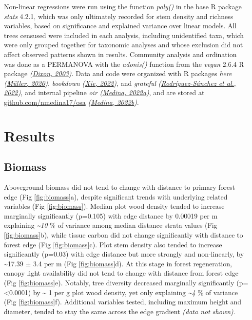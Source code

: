 \documentclass[
  12pt,
]{article}
\begin{document}
Non-linear regressions were run using the function \emph{poly()} in the base R package \emph{stats} 4.2.1,
which was only ultimately recorded for stem density and richness variables, based on significance and explained variance over linear models.
All trees censused were included in each analysis, including unidentified taxa, which were only grouped together for taxonomic analyses and whose exclusion did not affect observed patterns shown in results.
Community analysis and ordination was done as a PERMANOVA with the \emph{adonis()} function from the \emph{vegan} 2.6.4 R package \emph{(\protect\hyperlink{ref-dixon03}{Dixon, 2003})}.
Data and code were organized with R packages \emph{here} \emph{(\protect\hyperlink{ref-here}{Müller, 2020})}, \emph{bookdown} \emph{(\protect\hyperlink{ref-bookdown2022}{Xie, 2022})}, and \emph{grateful} \emph{(\protect\hyperlink{ref-grateful}{Rodríguez-Sánchez et al., 2022})}, and internal pipeline \emph{oir} \emph{(\protect\hyperlink{ref-softwareMedina22oir}{Medina, 2022a})}, and are stored at \url{github.com/nmedina17/osa} \emph{(\protect\hyperlink{ref-softwareMedina22osa}{Medina, 2022b})}.

\hypertarget{results}{%
\section{Results}\label{results}}

\hypertarget{biomass}{%
\subsection{Biomass}\label{biomass}}

Aboveground biomass did not tend to change with distance to primary forest edge
(Fig \ref{fig:biomass}a), despite significant trends with underlying related variables
(Fig \ref{fig:biomass}).
Median plot wood density tended to increase marginally significantly
(p=0.105)
with edge distance by
0.00019 per m
explaining
\emph{\textasciitilde10} \% of variance
among median distance strata values
(Fig \ref{fig:biomass}b),
while tissue carbon did not change significantly with distance to forest edge
(Fig \ref{fig:biomass}c).
Plot stem density also tended to increase significantly
(p=0.03)
with edge distance but more strongly and non-linearly, by
\textasciitilde17.39 ±
3.4 per m
(Fig \ref{fig:biomass}d).
At this stage in forest regeneration, canopy light availability did not tend to change with distance from forest edge
(Fig \ref{fig:biomass}e).
Notably, tree diversity decreased marginally significantly
(p=\textless0.0001)
by
\textasciitilde{} 1
per g plot wood density,
yet only explaining
\emph{\textasciitilde4} \% of variance
(Fig \ref{fig:biomass}f).
Additional variables tested, including maximum height and diameter, tended to stay the same across the edge gradient \emph{(data not shown)}.
\end{document}
